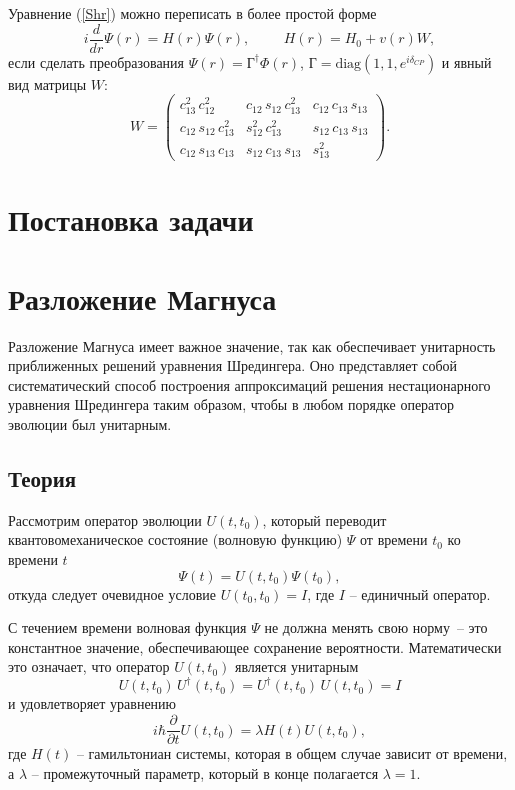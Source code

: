 \documentclass[12pt]{article}
\numberwithin{equation}{section}
\begin{document}
Уравнение (\ref{Shr}) можно переписать в более простой форме
\begin{equation}
i\frac{d}{dr}\Psi(r)=H(r)\Psi(r),\hspace{1cm} H(r)=H_0 + v(r)W,
\end{equation}
если сделать преобразования $\Psi(r)=\text{Г}^\dagger\Phi(r)$, $\text{Г}=\text{diag}(1,1,e^{i\delta_{CP}})$ и явный вид матрицы $W$:
\begin{equation}
\label{W}
W=
\begin{pmatrix}
c^2_{13}\, c^2_{12}& c_{12}\, s_{12}\, c^2_{13}& c_{12}\, c_{13}\, s_{13}\\
c_{12}\, s_{12}\, c^2_{13}& s^2_{12}\, c^2_{13}& s_{12}\, c_{13}\, s_{13}\\
c_{12}\, s_{13}\, c_{13}& s_{12}\, c_{13}\, s_{13}& s^2_{13}
\end{pmatrix}.
\end{equation}

\newpage 
\section{Постановка задачи}


\section{Разложение Магнуса}

Разложение Магнуса имеет важное значение, так как обеспечивает унитарность приближенных решений уравнения Шредингера. Оно представляет собой систематический способ построения аппроксимаций решения нестационарного уравнения Шредингера таким образом, чтобы в любом порядке оператор эволюции был унитарным.

\subsection{Теория}

Рассмотрим оператор эволюции $U(t,t_0)$, который переводит квантовомеханическое состояние (волновую функцию) $\Psi$ от времени $t_0$ ко времени $t$
%
\begin{equation}
\Psi(t)=U(t,t_0)\Psi(t_0),
\end{equation}
откуда следует очевидное условие $U(t_0,t_0)=I$, где $I$ -- единичный оператор.

С течением времени волновая функция $\Psi$ не должна менять свою норму~-- это константное значение, обеспечивающее сохранение вероятности. Математически это означает, что оператор $U(t,t_0)$ является унитарным 
%
\begin{equation}
U(t,t_0)\,U^\dagger(t,t_0)=U^\dagger(t,t_0)\,U(t,t_0)=I
\end{equation}
и удовлетворяет уравнению
%
\begin{equation}
\label{HU}
i\hbar\frac{\partial}{\partial t} U(t,t_0)=\lambda H(t)U(t,t_0),
\end{equation}
где $H(t)$ -- гамильтониан системы, которая в общем случае зависит от времени, а $\lambda$ -- промежуточный параметр, который в конце полагается $\lambda=1$.
\end{document}
